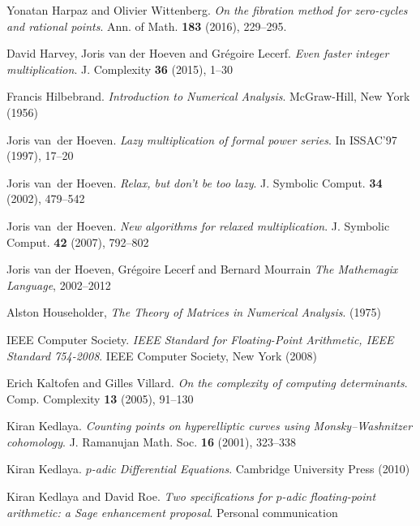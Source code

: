 \documentclass[11pt]{article}
\numberwithin{equation}{section}
\numberwithin{figure}{section}
\theoremstyle{definition}
\begin{document}
\begin{thebibliography}{99}
  Yonatan Harpaz and Olivier Wittenberg.
  \emph{On the fibration method for zero-cycles and rational points}.
  Ann. of Math. \textbf{183} (2016), 229--295.

  David Harvey, Joris van der Hoeven and Grégoire Lecerf. 
  \emph{Even faster integer multiplication}.
  J. Complexity \textbf{36} (2015), 1--30

  Francis Hilbebrand.
  \emph{Introduction to Numerical Analysis}.
  McGraw-Hill, New York (1956)

  Joris van~der Hoeven.
  \emph{Lazy multiplication of formal power series}. 
  In ISSAC'97 (1997), 17--20

  Joris van~der Hoeven.
  \emph{Relax, but don't be too lazy}.
  {J. Symbolic Comput.} \textbf{34} (2002), 479--542

  Joris van~der Hoeven.
  \emph{New algorithms for relaxed multiplication}.
  {J. Symbolic Comput.} \textbf{42} (2007), 792--802

  Joris van der Hoeven, Grégoire Lecerf and Bernard Mourrain 
  \emph{The Mathemagix Language}, 2002--2012

  Alston Householder, 
  \emph{The Theory of Matrices in Numerical Analysis}. 
  (1975)

  IEEE Computer Society.
  \emph{{IEEE} Standard for Floating-Point Arithmetic, {IEEE} Standard 754-2008}.
  IEEE Computer Society, New York (2008)

  Erich Kaltofen and Gilles Villard.
  \emph{On the complexity of computing determinants}.
  Comp. Complexity \textbf{13} (2005), 91--130


  Kiran Kedlaya.
  \emph{Counting points on hyperelliptic curves using {M}onsky--{W}ashnitzer cohomology}.
  {J. Ramanujan Math. Soc.} \textbf{16} (2001), 323--338

  Kiran Kedlaya.
  \emph{$p$-adic Differential Equations}.
  Cambridge University Press (2010)

  Kiran Kedlaya and David Roe.
  \emph{Two specifications for $p$-adic floating-point arithmetic: a
  Sage enhancement proposal}.
  Personal communication


\end{thebibliography}
\end{document}
